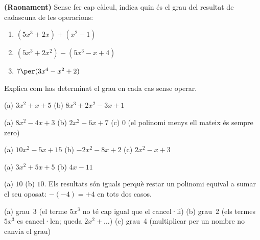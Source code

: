 \begin{exercicis}
\begin{exlist}
  \item \textbf{(Raonament)} Sense fer cap càlcul, indica quin és el grau
    del resultat de cadascuna de les operacions:
    \begin{enumerate}[label=\alph*), leftmargin=1.6em, topsep=2pt]
      \item $(5x^3 + 2x) + (x^2 - 1)$
      \item $(5x^3 + 2x^2) - (5x^3 - x + 4)$
      \item $7\per(3x^4 - x^2 + 2)$
    \end{enumerate}
    Explica com has determinat el grau en cada cas sense operar.
\end{exlist}
\end{exercicis}

\begin{solucions}
\begin{sollist}
  \item (a) $3x^2+x+5$ \quad (b) $8x^3+2x^2-3x+1$
  \item (a) $8x^2-4x+3$ \quad
        (b) $2x^2-6x+7$ \quad
        (c) $0$ (el polinomi menys ell mateix és sempre zero)
  \item (a) $10x^2-5x+15$ \quad
        (b) $-2x^2-8x+2$ \quad
        (c) $2x^2-x+3$
  \item (a) $3x^2+5x+5$ \quad (b) $4x-11$
  \item (a) $10$ \quad (b) $10$. Els resultats són iguals perquè restar un
        polinomi equival a sumar el seu oposat: $-(-4)=+4$ en tots dos casos.
  \item (a) grau~3 (el terme $5x^3$ no té cap igual que el cancel·li) \quad
        (b) grau~2 (els termes $5x^3$ es cancel·len; queda $2x^2+\ldots$) \quad
        (c) grau~4 (multiplicar per un nombre no canvia el grau)
\end{sollist}
\end{solucions}
